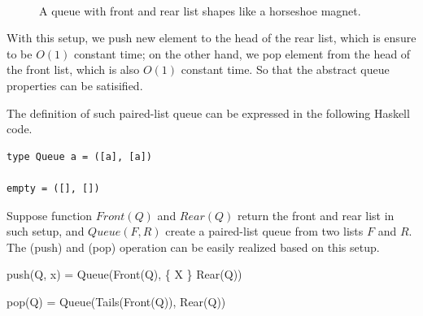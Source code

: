 \documentclass{article}
\begin{document}
\begin{figure}[htbp]
  \centering
   \\
  \caption{A queue with front and rear list shapes like a horseshoe magnet.} \label{fig:horseshoe-magnet}
\end{figure}

With this setup, we push new element to the head of the rear list, which is
ensure to be $O(1)$ constant time; on the other hand, we pop element from
the head of the front list, which is also $O(1)$ constant time.
So that the abstract queue properties can be satisified.

The definition of such paired-list queue can be expressed in the following
Haskell code.

\lstset{language=Haskell}
\begin{lstlisting}
type Queue a = ([a], [a])

empty = ([], [])
\end{lstlisting}

Suppose function $Front(Q)$ and $Rear(Q)$ return the front and rear
list in such setup, and $Queue(F, R)$ create a paired-list queue from
two lists $F$ and $R$.
The  (push) and  (pop) operation can
be easily realized based on this setup.

\be
push(Q, x) = Queue(Front(Q), \{ X \} \cup Rear(Q))
\ee

\be
pop(Q) = Queue(Tails(Front(Q)), Rear(Q))
\ee
\end{document}
